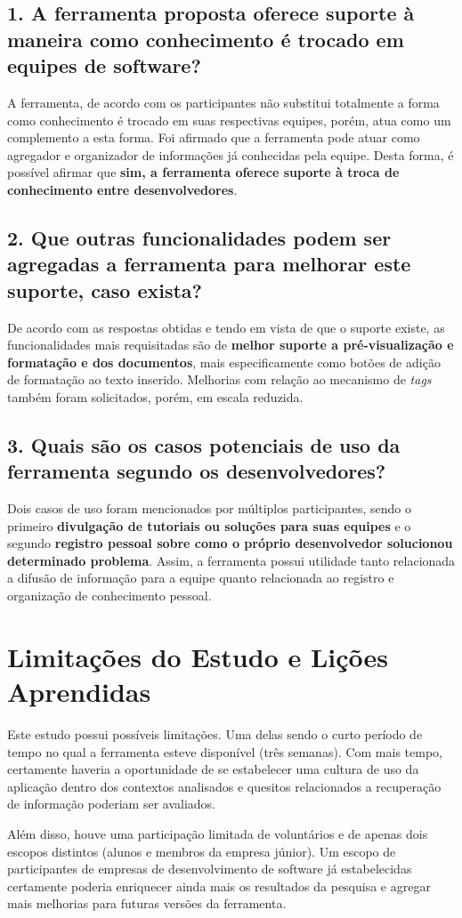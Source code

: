 \subsection{1. A ferramenta proposta oferece suporte à maneira como conhecimento é trocado em equipes de software?}

A ferramenta, de acordo com os participantes não substitui totalmente a forma como conhecimento é trocado em suas respectivas equipes, porém, atua como um complemento a esta forma. Foi afirmado que a ferramenta pode atuar como agregador e organizador de informações já conhecidas pela equipe. Desta forma, é possível afirmar que \textbf{sim, a ferramenta oferece suporte à troca de conhecimento entre desenvolvedores}.

\subsection{2. Que outras funcionalidades podem ser agregadas a ferramenta para melhorar este suporte, caso exista?}

De acordo com as respostas obtidas e tendo em vista de que o suporte existe, as funcionalidades mais requisitadas são de \textbf{melhor suporte a pré-visualização e formatação e dos documentos}, mais especificamente como botões de adição de formatação ao texto inserido. Melhorias com relação ao mecanismo de \textit{tags} também foram solicitados, porém, em escala reduzida.

\subsection{3. Quais são os casos potenciais de uso da ferramenta segundo os desenvolvedores?}

Dois casos de uso foram mencionados por múltiplos participantes, sendo o primeiro \textbf{divulgação de tutoriais ou soluções para suas equipes} e o segundo \textbf{registro pessoal sobre como o próprio desenvolvedor solucionou determinado problema}. Assim, a ferramenta possui utilidade tanto relacionada a difusão de informação para a equipe quanto relacionada ao registro e organização de conhecimento pessoal.

\section{Limitações do Estudo e Lições Aprendidas}

Este estudo possui possíveis limitações. Uma delas sendo o curto período de tempo no qual a ferramenta esteve disponível (três semanas). Com mais tempo, certamente haveria a oportunidade de se estabelecer uma cultura de uso da aplicação dentro dos contextos analisados e quesitos relacionados a recuperação de informação poderiam ser avaliados.

Além disso, houve uma participação limitada de voluntários e de apenas dois escopos distintos (alunos e membros da empresa júnior). Um escopo de participantes de empresas de desenvolvimento de software já estabelecidas certamente poderia enriquecer ainda mais os resultados da pesquisa e agregar mais melhorias para futuras versões da ferramenta.


